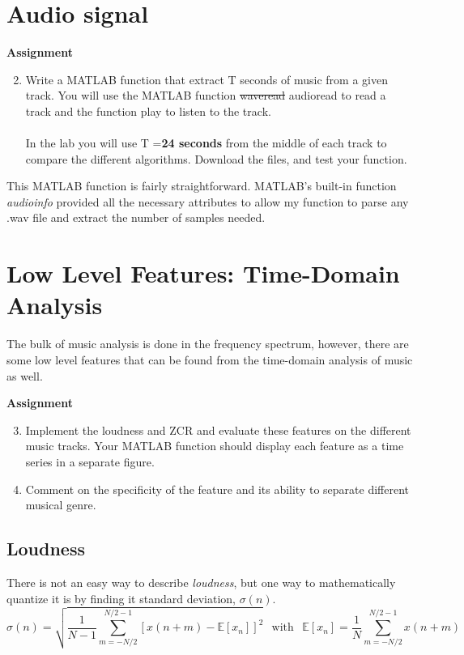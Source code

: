 \documentclass{article} %
\begin{document}
\section{Audio signal}

\begin{framed}
\textbf{Assignment}
\begin{enumerate}
\setcounter{enumi}{1}
\item Write a MATLAB function that extract T seconds of music from a given track. You
will use the MATLAB function \sout{waveread} audioread to read a track and the function play to
listen to the track.\\\\
In the lab you will use T =\textbf{24 seconds} from the middle of each track to compare the
different algorithms. Download the files, and test your function.
\end{enumerate}
\end{framed}



This MATLAB function is fairly straightforward. MATLAB's built-in function \emph{audioinfo} provided all the necessary attributes to allow my function to parse
any .wav file and extract the number of samples needed. 

\section{Low Level Features: Time-Domain Analysis}
The bulk of music analysis is done in the frequency spectrum, however, 
there are some low level features that can be found from the time-domain
analysis of music as well. 

\begin{framed}
\textbf{Assignment}
\begin{enumerate}
\setcounter{enumi}{2}
\item Implement the loudness and ZCR and evaluate these features on the different music
tracks. Your MATLAB function should display each feature as a time series in a separate
figure.
\item Comment on the specificity of the feature and its ability to separate different musical genre. 
\end{enumerate}
\end{framed}

\subsection{Loudness}
There is not an easy way to describe \emph{loudness}, but 
one way to mathematically quantize it is by finding it
standard deviation, $\sigma(n)$. \\
\begin{equation}\label{eq:loud_std}
\sigma(n)=\sqrt{\frac{1}{N-1} \sum\limits_{m=-N/2}^{N/2-1} 
[ x(n+m)-\mathbb{E}[x_n]]^2 }\hspace{5pt} \text{ with }\hspace{5pt} 
\mathbb{E}[x_n]=\frac{1}{N}\sum\limits_{m=-N/2}^{N/2-1}x(n+m)
\end{equation}
\end{document}

